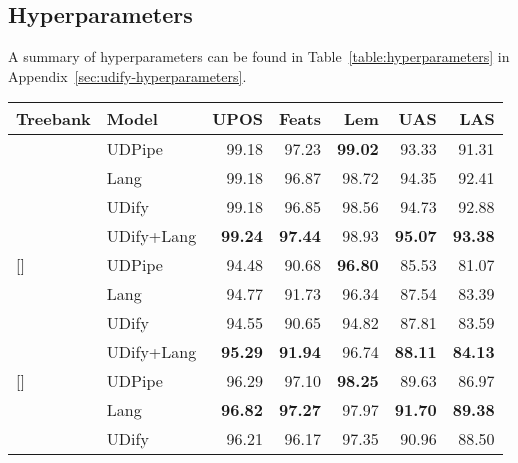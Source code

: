 \documentclass[11pt,a4paper]{article}
\begin{document}
\subsection{Hyperparameters}

A summary of hyperparameters can be found in Table~\ref{table:hyperparameters} in Appendix~\ref{sec:udify-hyperparameters}.


\begin{table}[!t]
    \fontsize{8}{10}\selectfont
    \begin{center}
    \setlength{\tabcolsep}{2pt}
    \begin{tabularx}{\linewidth}{@{}Xlrrrrr@{}}
    \toprule
        \sc Treebank & \sc Model & \sc UPOS & \sc Feats & \sc Lem & \sc UAS & \sc LAS \\
    \midrule
    [\normalbaselineskip]{}
        & UDPipe     &      99.18 &      97.23 &  \bf 99.02 &      93.33 &      91.31 \\
    \addlinespace[2pt]
        & Lang       &      99.18 &      96.87 &      98.72 &      94.35 &      92.41 \\
        & UDify      &      99.18 &      96.85 &      98.56 &      94.73 &      92.88 \\
        & UDify+Lang &  \bf 99.24 &  \bf 97.44 &      98.93 &  \bf 95.07 &  \bf 93.38 \\
    \addlinespace[5pt]
    [\normalbaselineskip]{}
        & UDPipe     &      94.48 &      90.68 &  \bf 96.80 &      85.53 &      81.07 \\
        & Lang       &      94.77 &      91.73 &      96.34 &      87.54 &      83.39 \\
        & UDify      &      94.55 &      90.65 &      94.82 &      87.81 &      83.59 \\
        & UDify+Lang &  \bf 95.29 &  \bf 91.94 &      96.74 &  \bf 88.11 &  \bf 84.13 \\
    \addlinespace[5pt]
    [\normalbaselineskip]{}
        & UDPipe     &      96.29 &      97.10 &  \bf 98.25 &      89.63 &      86.97 \\
    \addlinespace[2pt]
        & Lang       &  \bf 96.82 &  \bf 97.27 &      97.97 &  \bf 91.70 &  \bf 89.38 \\
        & UDify      &      96.21 &      96.17 &      97.35 &      90.96 &      88.50 \\

\end{tabularx}
\end{center}
\end{table}
\end{document}
